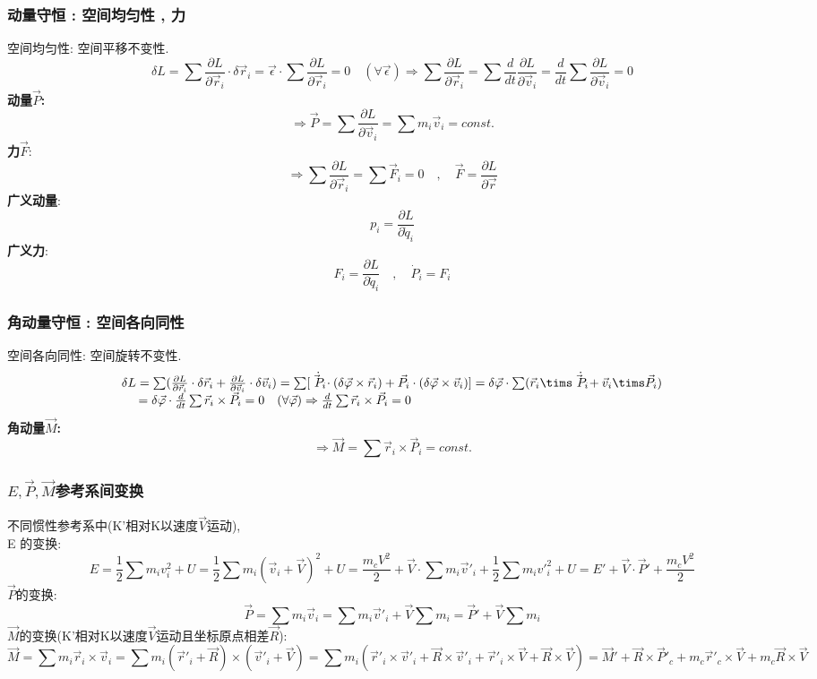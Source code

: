 \documentclass{article}
\begin{document}
\subsubsection{动量守恒 : 空间均匀性 , \quad 力}
空间均匀性: 空间平移不变性.\\
\[\delta L = \sum \frac{\partial L}{\partial \vec r_i}\cdot \delta \vec r_i
 = \vec \epsilon \cdot \sum \frac{\partial L}{\partial \vec r_i} = 0\quad(\forall \vec \epsilon)
\Rightarrow \sum \frac{\partial L}{\partial \vec r_i}
 = \sum \frac{d}{dt} \frac{\partial L}{\partial \vec v_i}
 = \frac{d}{dt} \sum \frac{\partial L}{\partial \vec v_i} = 0\]
\textbf{动量$\vec P$: }
\[\Rightarrow \vec P = \sum \frac{\partial L}{\partial \vec v_i} = \sum m_i \vec v_i = const.\]
\textbf{力$\vec F$}:
\[\Rightarrow \sum \frac{\partial L}{\partial \vec r_i} = \sum \vec F_i = 0 \quad , \quad \vec F = \frac{\partial L}{\partial \vec r}\]
\textbf{广义动量}:
\[p_i = \frac{\partial L}{\partial \dot q_i}\]
\textbf{广义力}:
\[F_i = \frac{\partial L}{\partial \dot q_i} \quad , \quad \dot P_i = F_i\]

\subsubsection{角动量守恒 : 空间各向同性}
空间各向同性: 空间旋转不变性.
\begin{displaymath}
\begin{array}{ll}
\delta L = \sum (\frac{\partial L}{\partial \vec r_i} \cdot \delta \vec r_i + \frac{\partial L}{\partial \vec v_i} \cdot \delta \vec v_i)
 = \sum [\dot{\vec P_i} \cdot (\delta \vec \varphi \times \vec r_i) + \vec P_i \cdot ( \delta \vec \varphi \times \vec v_i )]
 = \delta \vec \varphi \cdot \sum (\vec r_i \tims \dot{\vec P_i} + \vec v_i \tims \vec P_i) \\
 \quad\  = \delta \vec \varphi \cdot \frac{d}{dt} \sum \vec r_i \times \vec P_i
 = 0\quad(\forall \vec \varphi)
 \Rightarrow \frac{d}{dt}\sum \vec r_i \times \vec P_i = 0
\end{array}
\end{displaymath}
\textbf{角动量$\vec M$: }
\[\Rightarrow \vec M = \sum \vec r_i \times \vec P_i = const.\]


\subsubsection{$E,\vec P,\vec M$参考系间变换}
不同惯性参考系中(K'相对K以速度$\vec V$运动),\\
E 的变换:
\[E = \frac{1}{2} \sum m_iv_i^2 + U = \frac{1}{2} \sum m_i(\vec v_i + \vec V)^2 + U 
 = \frac{m_c V^2}{2} + \vec V \cdot \sum m_i \vec v'_i + \frac{1}{2} \sum m_i v'_i^2 + U
 = E' + \vec V \cdot \vec P' + \frac{m_c V^2}{2}\]
$\vec P$的变换:
\[\vec P = \sum m_i \vec v_i = \sum m_i \vec v'_i + \vec V \sum m_i = \vec P' + \vec V \sum m_i\]
$\vec M$的变换(K'相对K以速度$\vec V$运动且坐标原点相差$\vec R$):
\[\vec M = \sum m_i \vec r_i \times \vec v_i = \sum m_i (\vec r'_i + \vec R) \times (\vec v'_i + \vec V)
 = \sum m_i( \vec r'_i \times \vec v'_i +  \vec R \times \vec v'_i + \vec r'_i \times \vec V + \vec R \times \vec V)
 = \vec M' + \vec R \times \vec P'_c + m_c \vec r'_c \times \vec V + m_c \vec R \times \vec V\]
\end{document}
